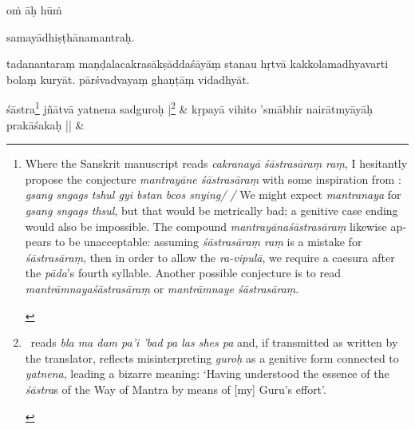 \documentclass[naipra.tex]{subfiles}
\begin{document}
\begin{sanskrit}
\pstart
\begin{mantra}oṁ āḥ hūṁ\end{mantra}\Emdash samayādhiṣṭhānamantraḥ. 
\pend



\pstart
tadanantaraṃ maṇḍalacakrasākṣāddaśāyāṃ stanau hṛtvā  kakkolamadhyavarti bolaṃ kuryāt. pārśvadvayaṃ ghaṇṭāṃ vidadhyāt. 
\pend


\medskip\versequote
{} śāstra\footnote{
	\begin{english}%
		Where the Sanskrit manuscript reads \emph{cakranayā śāstrasāraṃ raṃ}, I hesitantly propose the conjecture \emph{mantrayāne śāstrasāraṃ} with some inspiration from \TIB : \emph{gsang sngags tshul gyi bstan bcos snying/ /}
		We might expect \emph{mantranaya} for \emph{gsang sngags thsul}, but that would be metrically bad; a genitive case ending would also be impossible.
		The compound \emph{mantrayānaśāstrasāraṃ} likewise appears to be unacceptable: assuming \emph{śāstrasāraṃ raṃ} is a mistake for \emph{śāstrasāraṃ}, then in order to allow the \emph{ra-vipulā}, we require a caesura after the \emph{pāda}'s fourth syllable.
		Another possible conjecture is to read \emph{mantrāmnayaśāstrasāraṃ} or \emph{mantrāmnaye śāstrasāraṃ}.
	\end{english}
} jñātvā yatnena sadguroḥ |\footnote{
	\begin{english}%
		\TIB\ reads \emph{bla ma dam pa'i 'bad pa las shes pa} and, if transmitted as written by the translator, reflects misinterpreting \emph{guroḥ} as a genitive form connected to \emph{yatnena}, leading a bizarre meaning: `Having understood the essence of the \emph{śāstra}s of the Way of Mantra by means of [my] Guru's effort'.
	\end{english}
} &
kṛpayā vihito 'smābhir nairātmyāyāḥ prakāśakaḥ || \&



\end{sanskrit}
\end{document}
